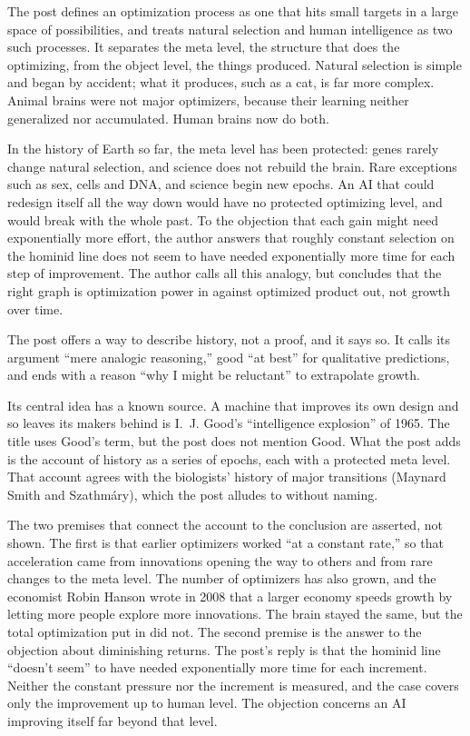 \begin{afterword}
\summaryhead

The post defines an optimization process as one that hits small targets in a large space of possibilities, and treats natural selection and human intelligence as two such processes. It separates the meta level, the structure that does the optimizing, from the object level, the things produced. Natural selection is simple and began by accident; what it produces, such as a cat, is far more complex. Animal brains were not major optimizers, because their learning neither generalized nor accumulated. Human brains now do both.

In the history of Earth so far, the meta level has been protected: genes rarely change natural selection, and science does not rebuild the brain. Rare exceptions such as sex, cells and DNA, and science begin new epochs. An AI that could redesign itself all the way down would have no protected optimizing level, and would break with the whole past. To the objection that each gain might need exponentially more effort, the author answers that roughly constant selection on the hominid line does not seem to have needed exponentially more time for each step of improvement. The author calls all this analogy, but concludes that the right graph is optimization power in against optimized product out, not growth over time.

\responsehead

The post offers a way to describe history, not a proof, and it says so. It calls its argument ``mere analogic reasoning,'' good ``at best'' for qualitative predictions, and ends with a reason ``why I might be reluctant'' to extrapolate growth.

Its central idea has a known source. A machine that improves its own design and so leaves its makers behind is I.~J. Good's ``intelligence explosion'' of 1965. The title uses Good's term, but the post does not mention Good. What the post adds is the account of history as a series of epochs, each with a protected meta level. That account agrees with the biologists' history of major transitions (Maynard Smith and Szathm\'ary), which the post alludes to without naming.

The two premises that connect the account to the conclusion are asserted, not shown. The first is that earlier optimizers worked ``at a constant rate,'' so that acceleration came from innovations opening the way to others and from rare changes to the meta level. The number of optimizers has also grown, and the economist Robin Hanson wrote in 2008 that a larger economy speeds growth by letting more people explore more innovations. The brain stayed the same, but the total optimization put in did not. The second premise is the answer to the objection about diminishing returns. The post's reply is that the hominid line ``doesn't seem'' to have needed exponentially more time for each increment. Neither the constant pressure nor the increment is measured, and the case covers only the improvement up to human level. The objection concerns an AI improving itself far beyond that level.


\end{afterword}
